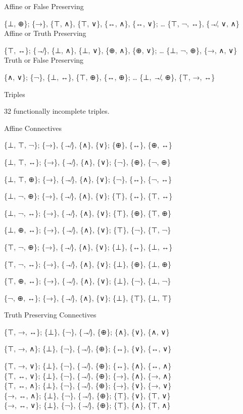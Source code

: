 Affine or False Preserving

\{⊥, ⊕\}; \{→\}, \{⊤, ∧\}, \{⊤, ∨\}, \{↔, ∧\}, \{↔, ∨\}; \ldots{} \{⊤,
¬, ↔\}, \{↛, ∨, ∧\}\\
Affine or Truth Preserving

\{⊤, ↔\}; \{↛\}, \{⊥, ∧\}, \{⊥, ∨\}, \{⊕, ∧\}, \{⊕, ∨\}; \ldots{} \{⊥,
¬, ⊕\}, \{→, ∧, ∨\}\\
Truth or False Preserving

\{∧, ∨\}; \{¬\}, \{⊥, ↔\}, \{⊤, ⊕\}, \{↔, ⊕\}; \ldots{} \{⊥, ↛, ⊕\},
\{⊤, →, ↔\}

\protect\hypertarget{anchor-14}{}{}Triples

32 functionally incomplete triples.

\protect\hypertarget{anchor-15}{}{}Affine Connectives

\{⊥, ⊤, ¬\}; \{→\}, \{↛\}, \{∧\}, \{∨\}; \{⊕\}, \{↔\}, \{⊕, ↔\}

\{⊥, ⊤, ↔\}; \{→\}, \{↛\}, \{∧\}, \{∨\}; \{¬\}, \{⊕\}, \{¬, ⊕\}

\{⊥, ⊤, ⊕\}; \{→\}, \{↛\}, \{∧\}, \{∨\}; \{¬\}, \{↔\}, \{¬, ↔\}

\{⊥, ¬, ⊕\}; \{→\}, \{↛\}, \{∧\}, \{∨\}; \{⊤\}, \{↔\}, \{⊤, ↔\}

\{⊥, ¬, ↔\}; \{→\}, \{↛\}, \{∧\}, \{∨\}; \{⊤\}, \{⊕\}, \{⊤, ⊕\}

\{⊥, ⊕, ↔\}; \{→\}, \{↛\}, \{∧\}, \{∨\}; \{⊤\}, \{¬\}, \{⊤, ¬\}

\{⊤, ¬, ⊕\}; \{→\}, \{↛\}, \{∧\}, \{∨\}; \{⊥\}, \{↔\}, \{⊥, ↔\}

\{⊤, ¬, ↔\}; \{→\}, \{↛\}, \{∧\}, \{∨\}; \{⊥\}, \{⊕\}, \{⊥, ⊕\}

\{⊤, ⊕, ↔\}; \{→\}, \{↛\}, \{∧\}, \{∨\}; \{⊥\}, \{¬\}, \{⊥, ¬\}

\{¬, ⊕, ↔\}; \{→\}, \{↛\}, \{∧\}, \{∨\}; \{⊥\}, \{⊤\}, \{⊥, ⊤\}

\protect\hypertarget{anchor-16}{}{}Truth Preserving Connectives

\{⊤, →, ↔\}; \{⊥\}, \{¬\}, \{↛\}, \{⊕\}; \{∧\}, \{∨\}, \{∧, ∨\}

\{⊤, →, ∧\}; \{⊥\}, \{¬\}, \{↛\}, \{⊕\}; \{↔\}, \{∨\}, \{↔, ∨\}

\{⊤, →, ∨\}; \{⊥\}, \{¬\}, \{↛\}, \{⊕\}; \{↔\}, \{∧\}, \{↔, ∧\}\\
\{⊤, ↔, ∨\}; \{⊥\}, \{¬\}, \{↛\}, \{⊕\}; \{→\}, \{∧\}, \{→, ∧\}\\
\{⊤, ↔, ∧\}; \{⊥\}, \{¬\}, \{↛\}, \{⊕\}; \{→\}, \{∨\}, \{→, ∨\}\\
\{→, ↔, ∧\}; \{⊥\}, \{¬\}, \{↛\}, \{⊕\}; \{⊤\}, \{∨\}, \{⊤, ∨\}\\
\{→, ↔, ∨\}; \{⊥\}, \{¬\}, \{↛\}, \{⊕\}; \{⊤\}, \{∧\}, \{⊤, ∧\}

